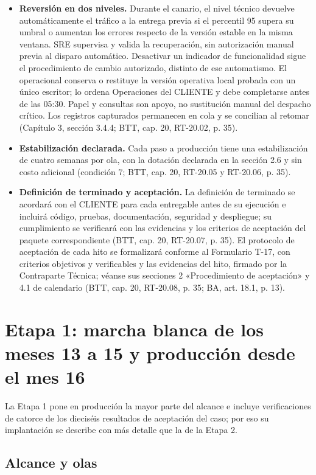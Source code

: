 \begin{itemize}
\item \textbf{Reversión en dos niveles.} Durante el canario, el nivel técnico devuelve automáticamente el tráfico a la entrega previa si el percentil 95 supera su umbral o aumentan los errores respecto de la versión estable en la misma ventana. SRE supervisa y valida la recuperación, sin autorización manual previa al disparo automático. Desactivar un indicador de funcionalidad sigue el procedimiento de cambio autorizado, distinto de ese automatismo. El operacional conserva o restituye la versión operativa local probada con un único escritor; lo ordena Operaciones del CLIENTE y debe completarse antes de las 05:30. Papel y consultas son apoyo, no sustitución manual del despacho crítico. Los registros capturados permanecen en cola y se concilian al retomar (Capítulo 3, sección 3.4.4; BTT, cap. 20, RT-20.02, p. 35).

\item \textbf{Estabilización declarada.} Cada paso a producción tiene una estabilización de cuatro semanas por ola, con la dotación declarada en la sección 2.6 y sin costo adicional (condición 7; BTT, cap. 20, RT-20.05 y RT-20.06, p. 35).

\item \textbf{Definición de terminado y aceptación.} La definición de terminado se acordará con el CLIENTE para cada entregable antes de su ejecución e incluirá código, pruebas, documentación, seguridad y despliegue; su cumplimiento se verificará con las evidencias y los criterios de aceptación del paquete correspondiente (BTT, cap. 20, RT-20.07, p. 35). El protocolo de aceptación de cada hito se formalizará conforme al Formulario T-17, con criterios objetivos y verificables y las evidencias del hito, firmado por la Contraparte Técnica; véanse sus secciones 2 «Procedimiento de aceptación» y 4.1 de calendario (BTT, cap. 20, RT-20.08, p. 35; BA, art. 18.1, p. 13).

\end{itemize}
\section{Etapa 1: marcha blanca de los meses 13 a 15 y producción desde el mes 16}

La Etapa 1 pone en producción la mayor parte del alcance e incluye verificaciones de catorce de los dieciséis resultados de aceptación del caso; por eso su implantación se describe con más detalle que la de la Etapa 2.

\subsection{Alcance y olas}

